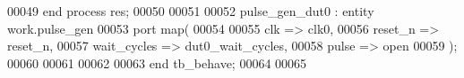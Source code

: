 \begin{DoxyCode}
00049    \textcolor{keywordflow}{end} \textcolor{keywordflow}{process} \textcolor{vhdlchar}{res};
00050    
00051    
00052    pulse\_gen\_dut0 : \textcolor{keywordflow}{entity} work.pulse_gen
00053    \textcolor{keywordflow}{port} \textcolor{keywordflow}{map}(
00054 
00055       clk         => clk0,
00056       reset_n     => reset_n,
00057       wait_cycles => dut0_wait_cycles,
00058       pulse       => \textcolor{keywordflow}{open}
00059    \textcolor{vhdlchar}{)};
00060    
00061 
00062    
00063    \textcolor{keywordflow}{end} \textcolor{vhdlchar}{tb\_behave};
00064   
00065 
\end{DoxyCode}
